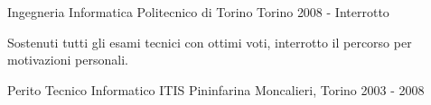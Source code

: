 

\begin{cventries}

  \cventry
    {Ingegneria Informatica} %
    {Politecnico di Torino} %
    {Torino} %
    {2008 - Interrotto} %
    {
      \begin{cvitems} %
        \item {Sostenuti tutti gli esami tecnici con ottimi voti, interrotto il percorso per motivazioni personali.}
      \end{cvitems}
    }

  \cventry
    {Perito Tecnico Informatico} %
    {ITIS Pininfarina} %
    {Moncalieri, Torino} %
    {2003 - 2008} %
    {
      \begin{cvitems} %
      \end{cvitems}
    }

\end{cventries}
